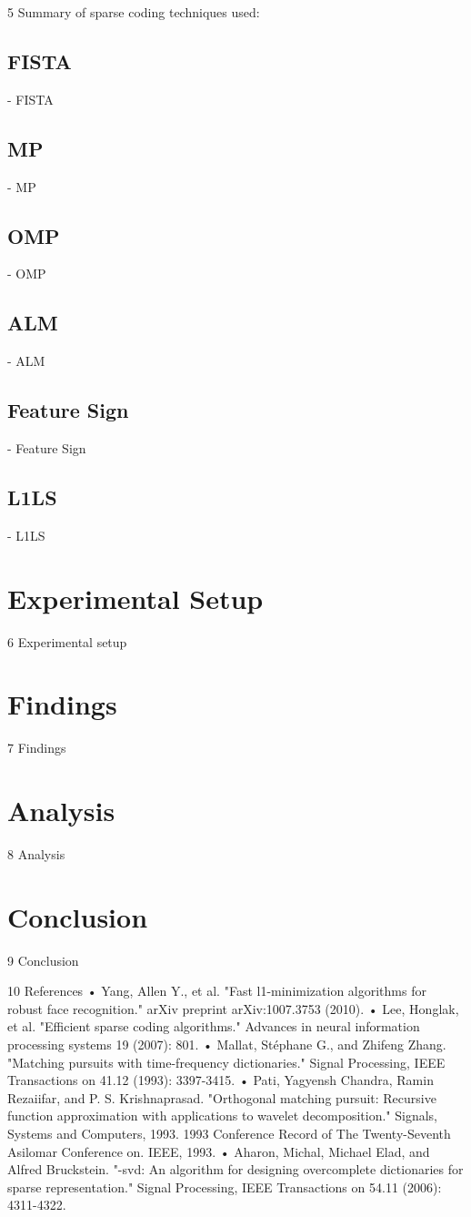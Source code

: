 \documentclass{article} %
\begin{document}
5 Summary of sparse coding techniques used:
\subsection{FISTA}
  -	FISTA
\subsection{MP}
  -	MP
\subsection{OMP}
  -	OMP
\subsection{ALM}
  -	ALM
\subsection{Feature Sign}
  -	Feature Sign
\subsection{L1LS}
  -	L1LS

\section{Experimental Setup}
6 Experimental setup

\section{Findings}
7 Findings

\section{Analysis}
8 Analysis

\section{Conclusion}
9 Conclusion

10 References
•	     Yang, Allen Y., et al. "Fast l1-minimization algorithms for robust face recognition." arXiv preprint arXiv:1007.3753 (2010).
•	Lee, Honglak, et al. "Efficient sparse coding algorithms." Advances in neural information processing systems 19 (2007): 801.
•	Mallat, Stéphane G., and Zhifeng Zhang. "Matching pursuits with time-frequency dictionaries." Signal Processing, IEEE Transactions on 41.12 (1993): 3397-3415.
•	Pati, Yagyensh Chandra, Ramin Rezaiifar, and P. S. Krishnaprasad. "Orthogonal matching pursuit: Recursive function approximation with applications to wavelet decomposition." Signals, Systems and Computers, 1993. 1993 Conference Record of The Twenty-Seventh Asilomar Conference on. IEEE, 1993.
•	Aharon, Michal, Michael Elad, and Alfred Bruckstein. "-svd: An algorithm for designing overcomplete dictionaries for sparse representation." Signal Processing, IEEE Transactions on 54.11 (2006): 4311-4322.
\end{document}
